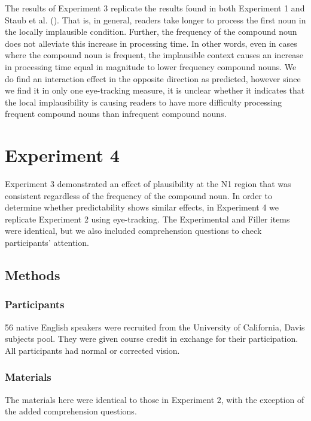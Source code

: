 \documentclass[
  12pt,
  letterpaper,
]{scrreport}
\begin{document}
The results of Experiment 3 replicate the results found in both
Experiment 1 and Staub et al.
(). That is, in
general, readers take longer to process the first noun in the locally
implausible condition. Further, the frequency of the compound noun does
not alleviate this increase in processing time. In other words, even in
cases where the compound noun is frequent, the implausible context
causes an increase in processing time equal in magnitude to lower
frequency compound nouns. We do find an interaction effect in the
opposite direction as predicted, however since we find it in only one
eye-tracking measure, it is unclear whether it indicates that the local
implausibility is causing readers to have more difficulty processing
frequent compound nouns than infrequent compound nouns.

\section{Experiment 4}\label{experiment-4}

Experiment 3 demonstrated an effect of plausibility at the N1 region
that was consistent regardless of the frequency of the compound noun. In
order to determine whether predictability shows similar effects, in
Experiment 4 we replicate Experiment 2 using eye-tracking. The
Experimental and Filler items were identical, but we also included
comprehension questions to check participants' attention.

\subsection{Methods}\label{methods-3}

\subsubsection{Participants}\label{participants-3}

56 native English speakers were recruited from the University of
California, Davis subjects pool. They were given course credit in
exchange for their participation. All participants had normal or
corrected vision.

\subsubsection{Materials}\label{materials-1}

The materials here were identical to those in Experiment 2, with the
exception of the added comprehension questions.
\end{document}
